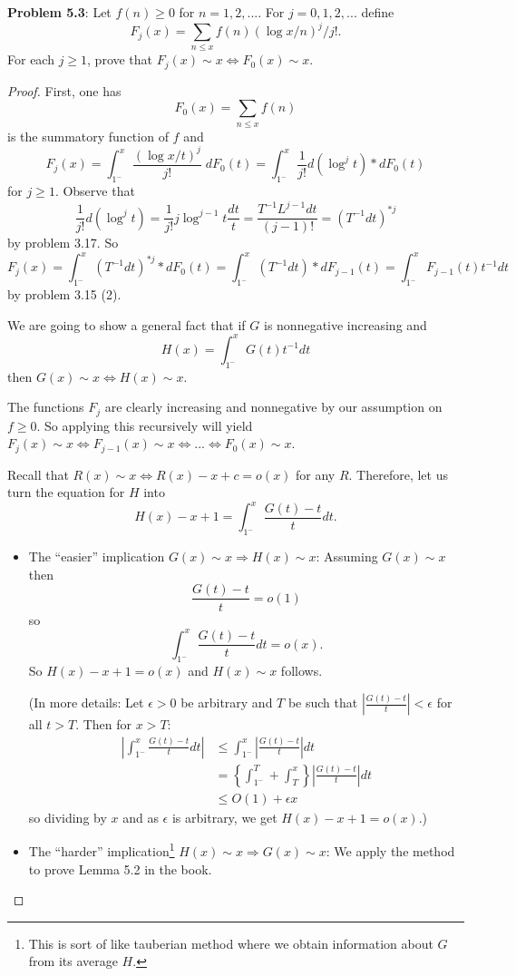 \documentclass[12pt]{article}
\newcommand{\Abs}[1]{\left| #1 \right|}
\renewcommand{\O}[1]{O\left( #1 \right)}
\begin{document}
\fi

\textbf{Problem 5.3}: Let $f(n) \geq 0$ for $n = 1, 2, ...$. For $j = 0, 1, 2, ...$ define
$$F_j(x) = \sum_{n \leq x} f(n) (\log x/n)^j / j!.$$
For each $j \geq 1$, prove that $F_j(x) \sim x \iff F_0(x) \sim x$.

\begin{proof}
First, one has
$$F_0(x) = \sum_{n \leq x} f(n)$$
is the summatory function of $f$ and
$$F_j(x) =  \int_{1^-}^x \frac{(\log x/t)^j}{j!} \; dF_0(t)
= \int_{1^-}^x \frac{1}{j!} d(\log^j t) * dF_0(t)$$
for $j \geq 1$. Observe that
$$\frac{1}{j!} d(\log^j t) = \frac{1}{j!} j \log^{j-1} t \frac{dt}{t} = \frac{T^{-1} L^{j-1} dt}{(j-1)!}
= (T^{-1} dt)^{*j}$$
by problem 3.17. So
$$F_j(x) = \int_{1^-}^x (T^{-1} dt)^{*j} * dF_0(t) = \int_{1^-}^x (T^{-1} dt) * dF_{j-1}(t) = \int_{1^-}^x F_{j-1}(t) t^{-1} dt$$
by problem 3.15 (2).

We are going to show a general fact that if $G$ is nonnegative increasing and
$$H(x) = \int_{1^-}^x G(t) t^{-1} dt$$
then $G(x) \sim x \iff H(x) \sim x$.

The functions $F_j$ are clearly increasing and nonnegative by our assumption on $f \geq 0$. So applying this recursively will yield $F_j(x) \sim x \iff F_{j-1}(x) \sim x \iff ... \iff F_0(x) \sim x$.

Recall that $R(x) \sim x \iff R(x) - x + c = o(x)$ for any $R$. Therefore, let us turn the equation for $H$ into
$$H(x) - x + 1 = \int_{1^-}^x \frac{G(t) - t}{t} dt.$$

\begin{itemize}
\item The ``easier'' implication $G(x) \sim x \Rightarrow H(x) \sim x$: Assuming $G(x) \sim x$ then
$$\frac{G(t) - t}{t} = o(1)$$
so
$$\int_{1^-}^x \frac{G(t) - t}{t} dt = o(x).$$
So $H(x) - x + 1 = o(x)$ and $H(x) \sim x$ follows.

(In more details: Let $\epsilon > 0$ be arbitrary and $T$ be such that $\Abs{ \frac{G(t) - t}{t} } < \epsilon$ for all $t > T$. Then for $x > T$:
\begin{align*}
\Abs{ \int_{1^-}^x \frac{G(t) - t}{t} dt }
&\leq \int_{1^-}^x \Abs{ \frac{G(t) - t}{t} } dt\\
&= \left\{ \int_{1^-}^T  + \int_{T}^x \right\} \Abs{ \frac{G(t) - t}{t} } dt\\
&\leq \O{1} + \epsilon x
\end{align*}
so dividing by $x$ and as $\epsilon$ is arbitrary, we get $H(x) - x + 1 = o(x)$.)

\item The ``harder'' implication\footnote{This is sort of like tauberian method where we obtain information about $G$ from its average $H$.} $H(x) \sim x \Rightarrow G(x) \sim x$: We apply the method to prove Lemma 5.2 in the book.


\end{itemize}
\end{proof}
\end{document}
